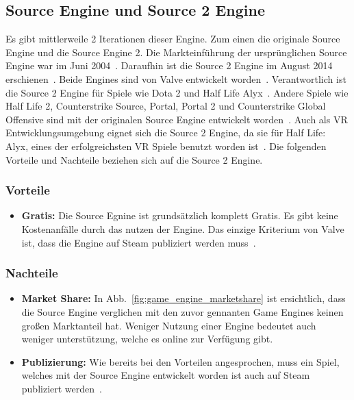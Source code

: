 \subsection{Source Engine und Source 2 Engine}
\label{subsec:source-engine-und-source-2-engine}

Es gibt mittlerweile 2 Iterationen dieser Engine.
Zum einen die originale Source Engine und die Source Engine 2.
Die Markteinführung der ursprünglichen Source Engine war im Juni 2004~\cite{Bryan_Wirtz_SOURCE_ENGINE_2022}.
Daraufhin ist die Source 2 Engine im August 2014 erschienen~\cite{VALVE_DEVELOPER_COMMUNITY_SOURCE2}.
Beide Engines sind von Valve entwickelt worden~\cite{VALVE_DEVELOPER_COMMUNITY_SOURCE, VALVE_DEVELOPER_COMMUNITY_SOURCE2}.
Verantwortlich ist die Source 2 Engine für Spiele wie Dota 2 und Half Life Alyx~\cite{WIKIPEDIA_SOURCE2_ENGINE_GAME_LIST}.
Andere Spiele wie Half Life 2, Counterstrike Source, Portal, Portal 2 und Counterstrike Global Offensive sind mit der originalen Source Engine entwickelt worden~\cite{WIKIPEDIA_SOURCE_ENGINE_GAME_LIST}.
Auch als VR Entwicklungsumgebung eignet sich die Source 2 Engine, da sie für Half Life: Alyx, eines der erfolgreichsten VR Spiele benutzt worden ist~\cite{WIKIPEDIA_SOURCE2_ENGINE_GAME_LIST, Aden_Carter_2020}.
Die folgenden Vorteile und Nachteile beziehen sich auf die Source 2 Engine.

\subsubsection{Vorteile}

\begin{itemize}
    \item \textbf{Gratis:} Die Source Egnine ist grundsätzlich komplett Gratis.
    Es gibt keine Kostenanfälle durch das nutzen der Engine.
    Das einzige Kriterium von Valve ist, dass die Engine auf Steam publiziert werden muss~\cite{Brenna_Hillier_2015}.
\end{itemize}


\subsubsection{Nachteile}\label{pgr:cons}

\begin{itemize}
    \item \textbf{Market Share:} In Abb.~\ref{fig:game_engine_marketshare} ist ersichtlich, dass die Source Engine verglichen mit den zuvor gennanten Game Engines keinen großen Marktanteil hat.
    Weniger Nutzung einer Engine bedeutet auch weniger unterstützung, welche es online zur Verfügung gibt.
    \item \textbf{Publizierung:} Wie bereits bei den Vorteilen angesprochen, muss ein Spiel, welches mit der Source Engine entwickelt worden ist auch auf Steam publiziert werden~\cite{Brenna_Hillier_2015}.
\end{itemize}

